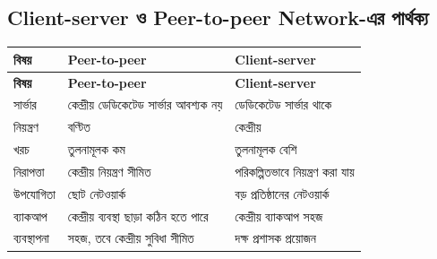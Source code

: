 


\subsection{Client-server ও Peer-to-peer Network-এর পার্থক্য}

\begingroup
\begin{longtable}{|p{}|p{}|p{}|}
\hline
\textbf{বিষয়} & \textbf{Peer-to-peer} & \textbf{Client-server} \\
\hline
\endfirsthead
\hline
\textbf{বিষয়} & \textbf{Peer-to-peer} & \textbf{Client-server} \\
\hline
\endhead

সার্ভার & কেন্দ্রীয় ডেডিকেটেড সার্ভার আবশ্যক নয় & ডেডিকেটেড সার্ভার থাকে \\
\hline
নিয়ন্ত্রণ & বণ্টিত & কেন্দ্রীয় \\
\hline
খরচ & তুলনামূলক কম & তুলনামূলক বেশি \\
\hline
নিরাপত্তা & কেন্দ্রীয় নিয়ন্ত্রণ সীমিত & পরিকল্পিতভাবে নিয়ন্ত্রণ করা যায় \\
\hline
উপযোগিতা & ছোট নেটওয়ার্ক & বড় প্রতিষ্ঠানের নেটওয়ার্ক \\
\hline
ব্যাকআপ & কেন্দ্রীয় ব্যবস্থা ছাড়া কঠিন হতে পারে & কেন্দ্রীয় ব্যাকআপ সহজ \\
\hline
ব্যবস্থাপনা & সহজ, তবে কেন্দ্রীয় সুবিধা সীমিত & দক্ষ প্রশাসক প্রয়োজন \\
\hline
\end{longtable}
\endgroup

